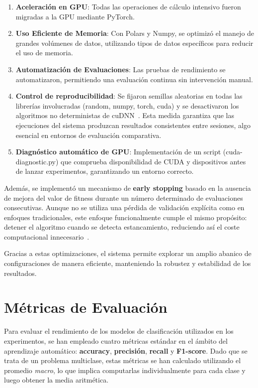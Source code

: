 \begin{enumerate}
      \item \textbf{Aceleración en GPU}: Todas las operaciones de cálculo intensivo fueron migradas a la GPU mediante
            PyTorch.
      \item \textbf{Uso Eficiente de Memoria}: Con Polars y Numpy, se optimizó el manejo de grandes volúmenes de datos,
            utilizando tipos de datos específicos para reducir el uso de memoria.
      \item \textbf{Automatización de Evaluaciones}: Las pruebas de rendimiento se automatizaron, permitiendo una
            evaluación continua sin intervención manual.
      \item \textbf{Control de reproducibilidad}: Se fijaron semillas aleatorias en todas las librerías involucradas
            (random, numpy, torch, cuda) y se desactivaron los algoritmos no deterministas de cuDNN~\cite{CuBLASDeterministicAlgorithms}.
            Esta medida garantiza que las ejecuciones del sistema produzcan resultados consistentes entre sesiones,
            algo esencial en entornos de evaluación comparativa.
      \item \textbf{Diagnóstico automático de GPU}: Implementación de un script (cuda-diagnostic.py) que comprueba disponibilidad
            de CUDA y dispositivos antes de lanzar experimentos, garantizando un entorno correcto.
\end{enumerate}

Además, se implementó un mecanismo de \textbf{early stopping} basado en la ausencia de mejora del valor de fitness durante
un número determinado de evaluaciones consecutivas.
Aunque no se utiliza una pérdida de validación explícita como en enfoques tradicionales, este enfoque funcionalmente cumple el mismo propósito:
detener el algoritmo cuando se detecta estancamiento, reduciendo así el coste computacional innecesario~\cite{EarlyStoppingDiscussion2024}.


Gracias a estas optimizaciones, el sistema permite explorar un amplio abanico de configuraciones de manera eficiente, manteniendo la robustez y estabilidad de los resultados.

\section{Métricas de Evaluación}\label{sec:metricas-evaluacion}

Para evaluar el rendimiento de los modelos de clasificación utilizados en los experimentos,
se han empleado cuatro métricas estándar en el ámbito del aprendizaje automático: \textbf{accuracy}, \textbf{precisión}, \textbf{recall} y \textbf{F1-score}.
Dado que se trata de un problema multiclase, estas métricas se han calculado utilizando el promedio \textit{macro},
lo que implica computarlas individualmente para cada clase y luego obtener la media aritmética.

